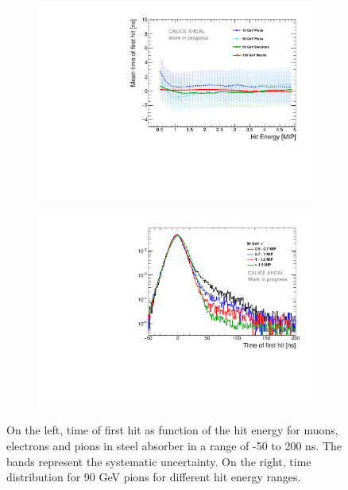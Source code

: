 \begin{figure}[htbp!]
	\begin{subfigure}[t]{0.5\textwidth}
		\centering
		\includegraphics[width=1\textwidth]{../Thesis_Plots/Timing/Pions/Plots/Timing_Energy_Comparison_ShortAsymRange.pdf}
		\caption{} \label{fig:Energy_Comparison}
	\end{subfigure}
	\hfill
	\begin{subfigure}[t]{0.5\textwidth}
		\centering
		\includegraphics[width=1\textwidth]{../Thesis_Plots/Timing/Pions/Plots/TimeEnergyBinsPions.pdf}
		\caption{} \label{fig:TimeBinsEnergy}
	\end{subfigure}
	\caption{On the left, time of first hit as function of the hit energy for muons, electrons and pions in steel absorber in a range of -50 to 200 ns. The bands represent the systematic uncertainty. On the right, time distribution for 90 GeV pions for different hit energy ranges.}
\end{figure}

